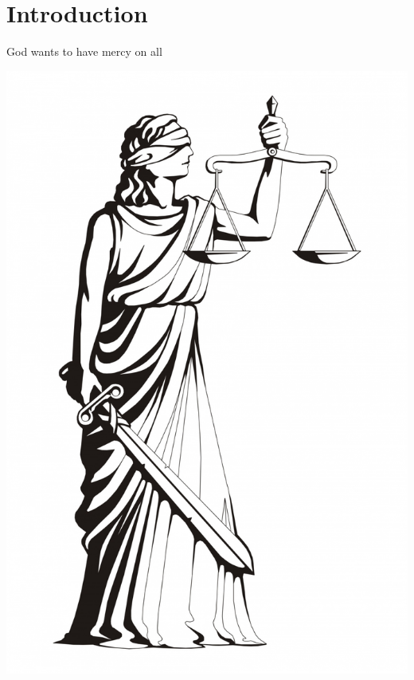 
\section{Introduction}

\begin{frame}{God wants to have mercy on all}

\begin{center}
\includegraphics[height=0.8\textheight]{figures/ladyJustice.jpg}
\end{center}


\end{frame}
